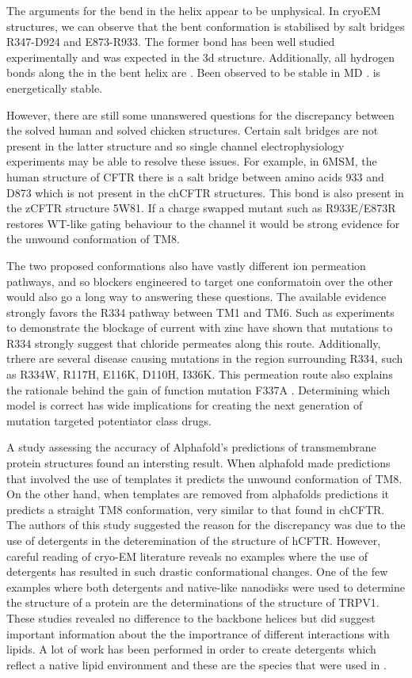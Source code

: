 The arguments for the bend in the helix appear to be unphysical. In cryoEM structures, we can observe that the bent conformation is stabilised by salt bridges R347-D924 and E873-R933. The former bond has been well studied experimentally and was expected in the 3d structure. Additionally, all hydrogen bonds along the in the bent helix are . Been observed to be stable in MD \cite{corradi2018} .  is energetically stable.

However, there are still some unanswered questions for the discrepancy between the solved human and solved chicken structures. Certain salt bridges are not present in the latter structure and so single channel electrophysiology experiments may be able to resolve these issues. For example, in 6MSM, the human structure of CFTR there is a salt bridge between amino acids 933 and D873 which is not present in the chCFTR structures. This bond is also present in the zCFTR structure 5W81. If a charge swapped mutant such as R933E/E873R restores WT-like gating behaviour to the channel it would be  strong evidence for the unwound conformation of TM8. 

The two proposed conformations also have vastly different ion permeation pathways, and so blockers engineered to target one conformatoin over the other would also go a long way to answering these questions. The available evidence strongly favors the R334 pathway between TM1 and TM6. Such as experiments to  demonstrate the blockage of current with zinc have shown that mutations to R334 strongly suggest that chloride permeates along this route. Additionally, trhere are several disease causing mutations in the region surrounding R334, such as R334W, R117H, E116K, D110H, I336K\cite{cftr2}. This permeation route also explains the rationale behind the gain of function mutation F337A \cite{}. Determining which model is correct has wide implications for creating the next generation of mutation targeted potentiator class drugs.

A study assessing the accuracy of Alphafold's predictions of transmembrane protein structures found an intersting result. When alphafold made predictions that involved the use of templates it predicts the unwound conformation of TM8. On the other hand, when templates are removed from alphafolds predictions it predicts a straight TM8 conformation, very similar to that found in chCFTR. The authors of this study suggested the reason for the discrepancy was due to the use of detergents in the deteremination of the structure of hCFTR. However, careful reading of cryo-EM literature reveals no examples where the use of detergents has resulted in such drastic conformational changes. One of the few examples where both detergents and native-like nanodisks were used to determine the structure of a protein are the determinations of the structure of TRPV1. These studies revealed no difference to the backbone helices but did suggest important information about the the importrance of different interactions with lipids. A lot of work has been performed in order to create detergents which reflect a native lipid environment and these are the species that were used in . 

